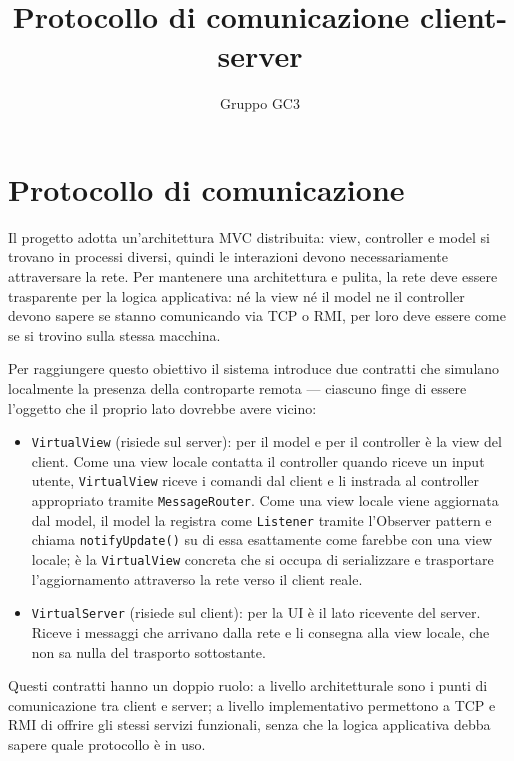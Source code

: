 \documentclass[11pt,a4paper]{article}
\title{Protocollo di comunicazione client-server}
\author{Gruppo GC3}
\date{}
\begin{document}
\maketitle
\tableofcontents
\newpage

\section{Protocollo di comunicazione}

Il progetto adotta un'architettura MVC distribuita: view, controller e model si trovano in
processi diversi, quindi le interazioni devono necessariamente attraversare la rete.
Per mantenere una architettura e pulita, la rete deve essere
trasparente per la logica applicativa: né la view né il model ne il controller 
devono sapere se stanno comunicando via TCP o RMI, per loro deve essere come se si trovino
sulla stessa macchina.

Per raggiungere questo obiettivo il sistema introduce due contratti che simulano localmente
la presenza della controparte remota --- ciascuno finge di essere l'oggetto che il proprio
lato dovrebbe avere vicino:
\begin{itemize}
    \item \texttt{VirtualView} (risiede sul server): per il model e per il controller
    è la view del client. Come una view locale contatta il controller quando riceve un
    input utente, \texttt{VirtualView} riceve i comandi dal client e li instrada al
    controller appropriato tramite \texttt{MessageRouter}. Come una view locale viene
    aggiornata dal model, il model la registra come \texttt{Listener} tramite l'Observer
    pattern e chiama \texttt{notifyUpdate()} su di essa esattamente come farebbe con una
    view locale; è la \texttt{VirtualView} concreta che si occupa di serializzare e
    trasportare l'aggiornamento attraverso la rete verso il client reale.

    \item \texttt{VirtualServer} (risiede sul client): per la UI è il lato ricevente
    del server. Riceve i messaggi che arrivano dalla rete e li consegna alla view locale,
    che non sa nulla del trasporto sottostante.
\end{itemize}

Questi contratti hanno un doppio ruolo: a livello architetturale sono i punti di comunicazione
tra client e server; a livello implementativo permettono a TCP e RMI di offrire gli stessi
servizi funzionali, senza che la logica applicativa debba sapere quale protocollo è in uso.
\end{document}
